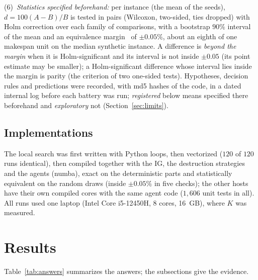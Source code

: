 \documentclass[conference,a4paper]{IEEEtran}
\begin{document}
(6)~\emph{Statistics specified beforehand:} per instance (the mean of the seeds), $d=100(A-B)/B$ is tested in pairs (Wilcoxon, two-sided, ties dropped) with Holm correction over each family of comparisons, with a bootstrap $90\%$ interval of the mean and an equivalence margin~\cite{Lakens2017} of $\pm0.05\%$, about an eighth of one makespan unit on the median synthetic instance.
A difference is \emph{beyond the margin} when it is Holm-significant and its interval is not inside $\pm0.05$ (its point estimate may be smaller); a Holm-significant difference whose interval lies inside the margin is parity (the criterion of two one-sided tests).
Hypotheses, decision rules and predictions were recorded, with md5 hashes of the code, in a dated internal log before each battery was run; \emph{registered} below means specified there beforehand and \emph{exploratory} not (Section~\ref{sec:limits}).

\subsection{Implementations}
The local search was first written with Python loops, then vectorized ($120$ of $120$ runs identical), then compiled together with the IG, the destruction strategies and the agents (numba), exact on the deterministic parts and statistically equivalent on the random draws (inside $\pm0.05\%$ in five checks); the other hosts have their own compiled cores with the same agent code ($1{,}606$ unit tests in all). All runs used one laptop (Intel Core i5-12450H, 8 cores, 16~GB), where $K$ was measured.

\section{Results}
Table~\ref{tab:answers} summarizes the answers; the subsections give the evidence.
\end{document}
